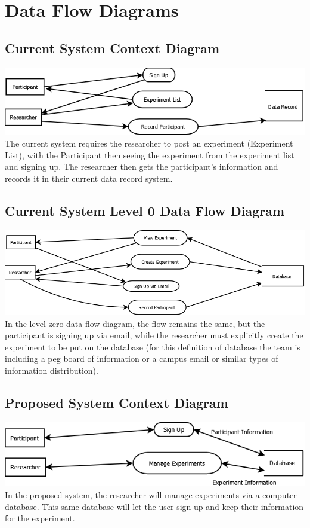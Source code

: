\section{Data Flow Diagrams}
\subsection{Current System Context Diagram}
\includegraphics[width=6in]{../other/data-flow-diagrams/current_system_context_diagram.png}\\
The current system requires the researcher to post an experiment (Experiment List), with the Participant then seeing the experiment from the experiment list and signing up.  The researcher then gets the participant's information and records it in their current data record system.

\subsection{Current System Level 0 Data Flow Diagram}
\includegraphics[width=6in]{../other/data-flow-diagrams/current_system_level0.png}\\
In the level zero data flow diagram, the flow remains the same, but the participant is signing up via email, while the researcher must explicitly create the experiment to be put on the database (for this definition of database the team is including a peg board of information or a campus email or similar types of information distribution).

\subsection{Proposed System Context Diagram}
\includegraphics[width=6in]{../other/data-flow-diagrams/new_system_context.png}\\
In the proposed system, the researcher will manage experiments via a computer database.  This same database will let the user sign up and keep their information for the experiment.

